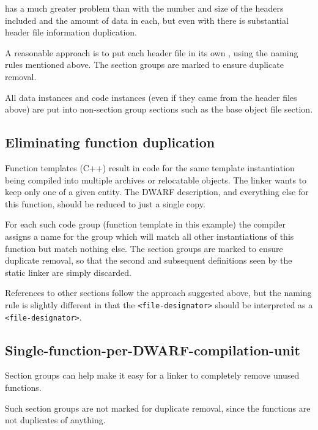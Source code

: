  has a much greater 
problem than 
 with the number and
size of the headers included and the amount of data in each,
but even with  
there is substantial header file information
duplication.

A reasonable approach is to put each header file in its own
, using the naming rules mentioned above. The
section groups are marked to ensure duplicate removal.

All data instances and code instances (even if they came
from the header files above) are put 
into non-section group
sections such as the base object file 
\dotdebuginfo{} section.

\subsection{Eliminating function duplication}
\label{app:eliminatingfunctionduplication}


Function templates (C++) result in code for the same template
instantiation being compiled into multiple archives or
relocatable objects. The linker wants to keep only one of a
given entity. The DWARF description, and everything else for
this function, should be reduced to just a single copy.

For each such code group (function template in this example)
the compiler assigns a name for the group which will match
all other instantiations of this function but match nothing
else. 
The 
section groups are marked to ensure duplicate
removal, so that the second and subsequent definitions seen
by the static linker are simply discarded.


References to other 
\dotdebuginfo{} sections follow the approach
suggested above, but the naming rule is slightly
different in that the \texttt{\textless file-designator\textgreater} 
should be interpreted as a \texttt{\textless file-designator\textgreater}.



\subsection{Single-function-per-DWARF-compilation-unit}
\label{app:singlefunctionperdwarfcompilationunit}

Section groups can help make it easy for a linker to completely
remove unused functions.

Such 
section groups are not marked for duplicate removal,
since the functions are not duplicates of anything.

